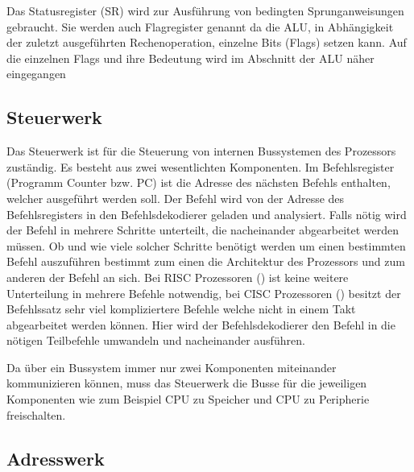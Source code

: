 \documentclass[12pt]{article}
\begin{document}
Das Statusregister (SR) wird zur Ausführung von bedingten Sprunganweisungen gebraucht. Sie werden auch Flagregister genannt da die ALU, in Abhängigkeit der zuletzt ausgeführten Rechenoperation, einzelne Bits (Flags) setzen kann. Auf die einzelnen Flags und ihre Bedeutung wird im Abschnitt der ALU näher eingegangen
\subsection{Steuerwerk}
Das Steuerwerk ist für die Steuerung von internen Bussystemen des Prozessors zuständig. Es besteht aus zwei wesentlichten Komponenten. Im Befehlsregister (Programm Counter bzw. PC) ist die Adresse des nächsten Befehls enthalten, welcher ausgeführt werden soll. Der Befehl wird von der Adresse des Befehlsregisters in den Befehlsdekodierer geladen und analysiert. Falls nötig wird der Befehl in mehrere Schritte unterteilt, die nacheinander abgearbeitet werden müssen. Ob und wie viele solcher Schritte benötigt werden um einen bestimmten Befehl auszuführen bestimmt zum einen die Architektur des Prozessors und zum anderen der Befehl an sich. Bei RISC Prozessoren 
() ist keine weitere Unterteilung in mehrere Befehle notwendig, bei CISC Prozessoren () besitzt der Befehlssatz sehr viel kompliziertere Befehle welche nicht in einem Takt abgearbeitet werden können. Hier wird der Befehlsdekodierer den Befehl in die nötigen Teilbefehle umwandeln und nacheinander ausführen.




Da über ein Bussystem immer nur zwei Komponenten miteinander kommunizieren können, muss das Steuerwerk die Busse für die jeweiligen Komponenten wie zum Beispiel CPU zu Speicher und CPU zu Peripherie freischalten. 
\cite{computerarchitecture2007}

%
\subsection{Adresswerk}
\end{document}
